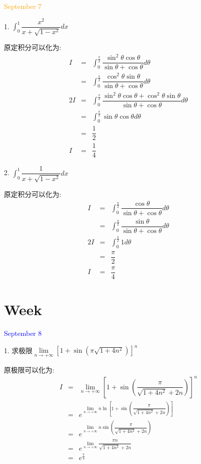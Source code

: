 \textcolor{orange}{September 7}

1. $\int_{0}^{1}\dfrac{x^2}{x+\sqrt{1-x^2}}dx$
\begin{solution}

	原定积分可以化为:  
	\begin{eqnarray*}
		I&=&\int_{0}^{\frac{\pi}{2}}\dfrac{\sin^2\theta\cos\theta}{\sin\theta+\cos\theta}d\theta\\
		&=&\int_{0}^{\frac{\pi}{2}}\dfrac{\cos^2\theta\sin\theta}{\sin\theta+\cos\theta}d\theta\\
		2I&=&\int_{0}^{\frac{\pi}{2}}\dfrac{\sin^2\theta\cos\theta+\cos^2\theta\sin\theta}{\sin\theta+\cos\theta}d\theta\\
		&=&\int_{0}^{\frac{\pi}{2}}\sin\theta\cos\theta d\theta\\
		&=&\dfrac{1}{2}\\
		I&=&\dfrac{1}{4}
	\end{eqnarray*}
\end{solution}

2. $\int_{0}^{1}\dfrac{1}{x+\sqrt{1-x^2}}dx$
\begin{solution}

	原定积分可以化为:  
	\begin{eqnarray*}
		I&=&\int_{0}^{\frac{\pi}{2}}\dfrac{\cos\theta}{\sin\theta+\cos\theta}d\theta\\
		&=&\int_{0}^{\frac{\pi}{2}}\dfrac{\sin\theta}{\sin\theta+\cos\theta}d\theta\\
		2I&=&\int_{0}^{\frac{\pi}{2}}1d\theta\\
		&=&\dfrac{\pi}{2}\\
		I&=&\dfrac{\pi}{4}
	\end{eqnarray*}
\end{solution}

\section{Week }
\textcolor{blue}{September 8}

1. 求极限$\lim\limits_{n\to+\infty}\left[1+\sin\left(\pi\sqrt{1+4n^2} \right) \right]^n$
\begin{solution}

	原极限可以化为:  
	\begin{eqnarray*}
		I&=&\lim\limits_{n\to+\infty}\left[1+\sin\left(\dfrac{\pi}{\sqrt{1+4n^2}+2n}\right) \right]^n\\
		&=&e^{\lim\limits_{n\to+\infty}n\ln\left[1+\sin\left(\dfrac{\pi}{\sqrt{1+4n^2}+2n}\right)\right]}\\
		&=&e^{\lim\limits_{n\to+\infty}n\sin\left(\dfrac{\pi}{\sqrt{1+4n^2}+2n}\right)}\\
		&=&e^{\lim\limits_{n\to+\infty}\dfrac{\pi n}{\sqrt{1+4n^2}+2n}}\\
		&=&e^{\frac{\pi}{4}}
	\end{eqnarray*}
\end{solution}

